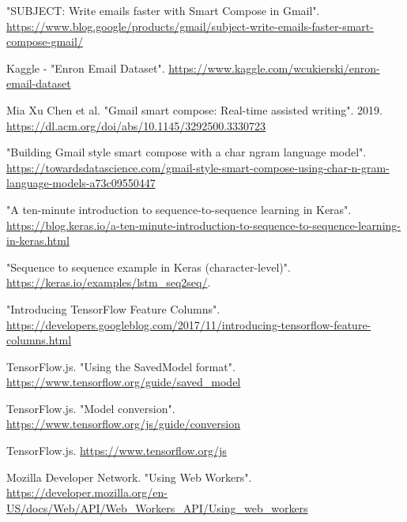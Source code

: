 \documentclass{article}
\begin{document}
\begin{thebibliography}{1}

\newblock "SUBJECT: Write emails faster with Smart Compose in Gmail". \url{https://www.blog.google/products/gmail/subject-write-emails-faster-smart-compose-gmail/}

\newblock Kaggle - "Enron Email Dataset". \url{https://www.kaggle.com/wcukierski/enron-email-dataset}

\newblock Mia Xu Chen et al. "Gmail smart compose: Real-time assisted writing". 2019. \url{https://dl.acm.org/doi/abs/10.1145/3292500.3330723}

\newblock "Building Gmail style smart compose with a char ngram language model". \url{https://towardsdatascience.com/gmail-style-smart-compose-using-char-n-gram-language-models-a73c09550447}

\newblock "A ten-minute introduction to sequence-to-sequence learning in Keras". \url{https://blog.keras.io/a-ten-minute-introduction-to-sequence-to-sequence-learning-in-keras.html}

\newblock "Sequence to sequence example in Keras (character-level)". \url{https://keras.io/examples/lstm_seq2seq/}.

\newblock "Introducing TensorFlow Feature Columns". \url{https://developers.googleblog.com/2017/11/introducing-tensorflow-feature-columns.html}

\newblock TensorFlow.js. "Using the SavedModel format". \url{https://www.tensorflow.org/guide/saved_model}

\newblock TensorFlow.js. "Model conversion". \url{https://www.tensorflow.org/js/guide/conversion}

\newblock TensorFlow.js. \url{https://www.tensorflow.org/js}

\newblock Mozilla Developer Network. "Using Web Workers". \url{https://developer.mozilla.org/en-US/docs/Web/API/Web_Workers_API/Using_web_workers}

\end{thebibliography}
\end{document}
